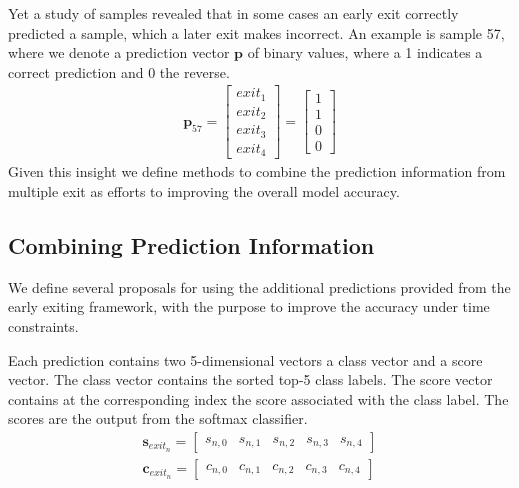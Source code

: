 Yet a study of samples revealed that in some cases an early exit correctly predicted a sample, which a later exit makes incorrect. An example is sample 57, where we denote a prediction vector $\mathbf{p}$ of binary values, where a 1 indicates a correct prediction and 0 the reverse. 
\begin{align*}
\mathbf{p}_{57}=
\begin{bmatrix}
exit_1 \\
exit_2 \\
exit_3 \\
exit_4
\end{bmatrix}
=
\begin{bmatrix}
1 \\
1 \\
0 \\
0
\end{bmatrix}
\end{align*}
Given this insight we define methods to combine the prediction information from multiple exit as efforts to improving the overall model accuracy. 

\subsection{Combining Prediction Information}

We define several proposals for using the additional predictions provided from the early exiting framework, with the purpose to improve the accuracy under time constraints. 

Each prediction contains two 5-dimensional vectors a class vector and a score vector. The class vector contains the sorted top-5 class labels. The score vector contains at the corresponding index the score associated with the class label. The scores are the output from the softmax classifier.
\begin{align*}
\mathbf{s}_{exit_n} = \begin{bmatrix}
s_{n,0} & s_{n,1} & s_{n,2} & s_{n,3} & s_{n,4}
\end{bmatrix} \\
\mathbf{c}_{exit_n} = \begin{bmatrix}
c_{n,0} & c_{n,1} & c_{n,2} & c_{n,3} & c_{n,4}
\end{bmatrix}
\end{align*}

